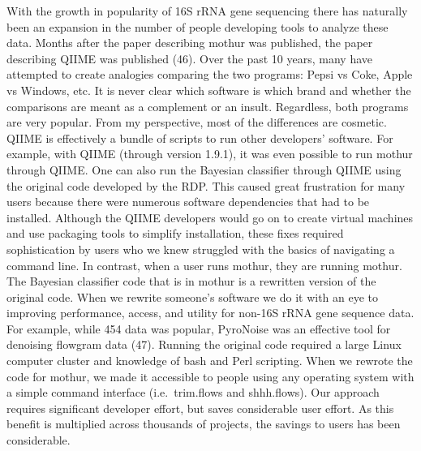 \documentclass[11pt,]{article}
\begin{document}
With the growth in popularity of 16S rRNA gene sequencing there has
naturally been an expansion in the number of people developing tools to
analyze these data. Months after the paper describing mothur was
published, the paper describing QIIME was published (46). Over the past
10 years, many have attempted to create analogies comparing the two
programs: Pepsi vs Coke, Apple vs Windows, etc. It is never clear which
software is which brand and whether the comparisons are meant as a
complement or an insult. Regardless, both programs are very popular.
From my perspective, most of the differences are cosmetic. QIIME is
effectively a bundle of scripts to run other developers' software. For
example, with QIIME (through version 1.9.1), it was even possible to run
mothur through QIIME. One can also run the  Bayesian
classifier through QIIME using the original code developed by the RDP.
This caused great frustration for many users because there were numerous
software dependencies that had to be installed. Although the QIIME
developers would go on to create virtual machines and use packaging
tools to simplify installation, these fixes required sophistication by
users who we knew struggled with the basics of navigating a command
line. In contrast, when a user runs mothur, they are running mothur. The
 Bayesian classifier code that is in mothur is a rewritten
version of the original code. When we rewrite someone's software we do
it with an eye to improving performance, access, and utility for non-16S
rRNA gene sequence data. For example, while 454 data was popular,
PyroNoise was an effective tool for denoising flowgram data (47).
Running the original code required a large Linux computer cluster and
knowledge of bash and Perl scripting. When we rewrote the code for
mothur, we made it accessible to people using any operating system with
a simple command interface (i.e.~trim.flows and shhh.flows). Our
approach requires significant developer effort, but saves considerable
user effort. As this benefit is multiplied across thousands of projects,
the savings to users has been considerable.
\end{document}
